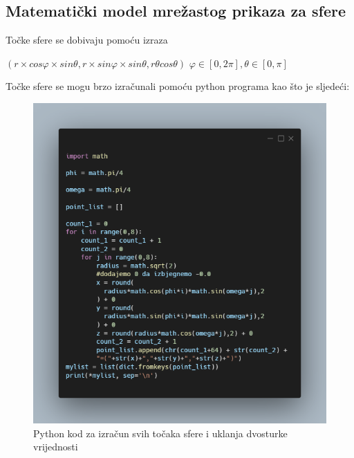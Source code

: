 \documentclass[a4paper,12pt]{article}
\newcommand\tab[1][1cm]{\hspace*{#1}}
\begin{document}
\clearpage
\subsection*{Matematički model mrežastog prikaza za sfere}

Točke sfere se dobivaju pomoću izraza 
\begin{center}
$(r \times cos \varphi \times sin \theta, r \times sin\varphi \times sin\theta, r \theta cos \theta)$ \tab $\varphi \in [0, 2\pi],\theta \in [0, \pi]$
\end{center}
Točke sfere se mogu brzo izračunali pomoću python programa kao što je sljedeći:
\begin{figure}[ht]
    \centering
    \includegraphics[scale=0.65]{image/python.png}
    \caption{Python kod za izračun svih točaka sfere i uklanja dvosturke vrijednosti}
    
\end{figure}
\end{document}
